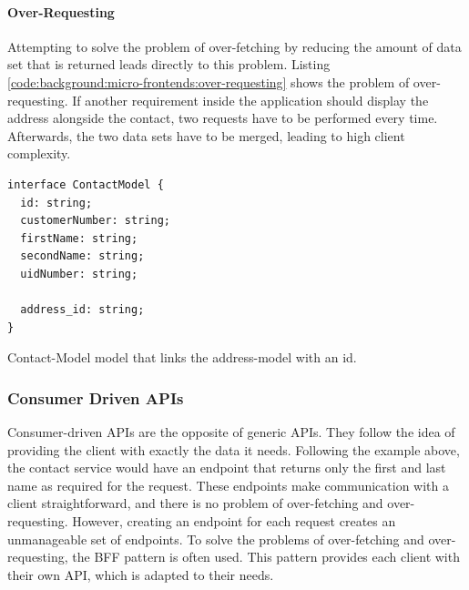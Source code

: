 \paragraph{Over-Requesting}\label{paragraph:background:micro-frontend:generic-vs-consumer-driven-apis:generic-apis:over-requesting}

Attempting to solve the problem of over-fetching by reducing the amount of data set that is returned leads directly to this problem. Listing \ref{code:background:micro-frontends:over-requesting} shows the problem of over-requesting. If another requirement inside the application should display the address alongside the contact, two requests have to be performed every time. Afterwards, the two data sets have to be merged, leading to high client complexity. \cite{misc:2019:leitner:background:micro-frontends:backend-for-frontends}

\ifshowListings
\begin{listing}[H]
    \begin{verbatim}
interface ContactModel {
  id: string;
  customerNumber: string;
  firstName: string;
  secondName: string;
  uidNumber: string;

  address_id: string;
}
    \end{verbatim}
    \caption{Contact-Model model that links the address-model with an id.}\label{code:background:micro-frontends:over-requesting}
\end{listing}
\fi

\subsubsection{Consumer Driven \acp{API}}\label{subsubection:background:micro-frontend:generic-vs-consumer-driven-apis:consumer-driven-apis}

Consumer-driven \acp{API} are the opposite of generic \acp{API}. They follow the idea of providing the client with exactly the data it needs. Following the example above, the contact service would have an endpoint that returns only the first and last name as required for the request. These endpoints make communication with a client straightforward, and there is no problem of over-fetching and over-requesting. However, creating an endpoint for each request creates an unmanageable set of endpoints.  \cite{misc:2019:leitner:background:micro-frontends:backend-for-frontends} To solve the problems of over-fetching and over-requesting, the \ac{BFF} pattern is often used. This pattern provides each client with their own \ac{API}, which is adapted to their needs. \cite{book:2018:richardson:background:bff:microservices-patterns}

